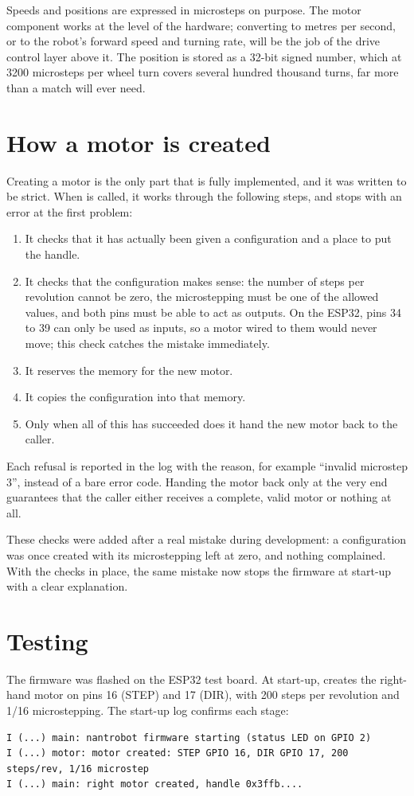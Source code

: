 Speeds and positions are expressed in microsteps on purpose. The motor component works at the level of the hardware; converting to metres per second, or to the robot's forward speed and turning rate, will be the job of the drive control layer above it. The position is stored as a 32-bit signed number, which at 3200 microsteps per wheel turn covers several hundred thousand turns, far more than a match will ever need.

\section{How a motor is created}
Creating a motor is the only part that is fully implemented, and it was written to be strict. When  is called, it works through the following steps, and stops with an error at the first problem:

\begin{enumerate}
  \item It checks that it has actually been given a configuration and a place to put the handle.
  \item It checks that the configuration makes sense: the number of steps per revolution cannot be zero, the microstepping must be one of the allowed values, and both pins must be able to act as outputs. On the ESP32, pins 34 to 39 can only be used as inputs, so a motor wired to them would never move; this check catches the mistake immediately.
  \item It reserves the memory for the new motor.
  \item It copies the configuration into that memory.
  \item Only when all of this has succeeded does it hand the new motor back to the caller.
\end{enumerate}

Each refusal is reported in the log with the reason, for example ``invalid microstep 3'', instead of a bare error code. Handing the motor back only at the very end guarantees that the caller either receives a complete, valid motor or nothing at all.

These checks were added after a real mistake during development: a configuration was once created with its microstepping left at zero, and nothing complained. With the checks in place, the same mistake now stops the firmware at start-up with a clear explanation.

\section{Testing}
The firmware was flashed on the ESP32 test board. At start-up,  creates the right-hand motor on pins 16 (STEP) and 17 (DIR), with 200 steps per revolution and 1/16 microstepping. The start-up log confirms each stage:

\begin{lstlisting}
I (...) main: nantrobot firmware starting (status LED on GPIO 2)
I (...) motor: motor created: STEP GPIO 16, DIR GPIO 17, 200 steps/rev, 1/16 microstep
I (...) main: right motor created, handle 0x3ffb....
\end{lstlisting}


